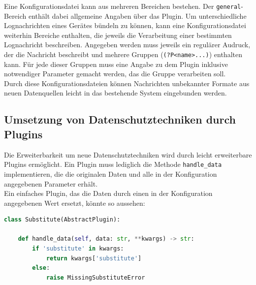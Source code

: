 Eine Konfigurationsdatei kann aus mehreren Bereichen bestehen. Der \texttt{general}-Bereich enthält dabei  allgemeine Angaben über das Plugin. Um unterschiedliche Lognachrichten eines Gerätes bündeln zu können, kann eine Konfigurationsdatei weiterhin Bereiche enthalten, die jeweils die Verarbeitung einer bestimmten Lognachricht beschreiben. Angegeben werden muss jeweils ein regulärer Audruck, der die Nachricht beschreibt und mehrere Gruppen (\texttt{(?P<name>...)}) enthalten kann. Für jede dieser Gruppen muss eine Angabe zu dem Plugin inklusive notwendiger Parameter gemacht werden, das die Gruppe verarbeiten soll.\\
Durch diese Konfigurationsdateien können Nachrichten unbekannter Formate aus neuen Datenquellen leicht in das bestehende System eingebunden werden.

\subsection{Umsetzung von Datenschutztechniken durch Plugins}
\label{sec_integration_in_ossim_plugins}

Die Erweiterbarkeit um neue Datenschutztechniken wird durch leicht erweiterbare Plugins ermöglicht. Ein Plugin muss lediglich die Methode \texttt{handle\_data} implementieren, die die originalen Daten und alle in der Konfiguration angegebenen Parameter erhält.\\
Ein einfaches Plugin, das die Daten durch einen in der Konfiguration angegebenen Wert ersetzt, könnte so aussehen:

\begin{lstlisting}[language=Python]
class Substitute(AbstractPlugin):

    def handle_data(self, data: str, **kwargs) -> str:
        if 'substitute' in kwargs:
            return kwargs['substitute']
        else:
            raise MissingSubstituteError
\end{lstlisting}